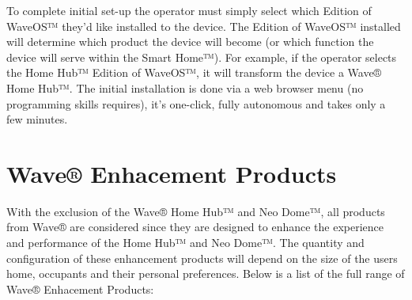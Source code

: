 \documentclass[letterpaper,10pt,openany,oneside,english]{sphinxmanual}
\begin{document}
To complete initial set-up the operator must simply select which Edition of WaveOS™ they’d like installed to the device.
The Edition of WaveOS™ installed will determine which product the device will become (or which function the device will serve within the  Smart Home™).
For example, if the operator selects the Home Hub™ Edition of WaveOS™, it will transform the device a Wave® Home Hub™.
The initial installation is done via a web browser menu (no programming skills requires), it’s one-click, fully autonomous and takes only a few minutes.


\section{Wave® Enhacement Products}
\label{\detokenize{introduction:wave-enhacement-products}}
With the exclusion of the Wave® Home Hub™ and Neo Dome™, all products from Wave® are considered  since they are designed to enhance the experience and performance of the Home Hub™ and Neo Dome™. The quantity and configuration of these enhancement products will depend on the size of the users home, occupants and their personal preferences. Below is a list of the full range of Wave® Enhacement Products:
\end{document}
